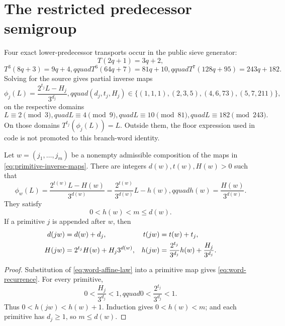 \section{The restricted predecessor semigroup}

Four exact lower-predecessor transports occur in the public sieve generator:
\[
 T(2q+1)=3q+2,
\]
\[
 T^3(8q+3)=9q+4,qquad
 T^6(64q+7)=81q+10,qquad
 T^7(128q+95)=243q+182.
\]
Solving for the source gives partial inverse maps
\begin{equation}
 \phi_j(L)=\frac{2^{t_j}L-H_j}{3^{d_j}},qquad
 (d_j,t_j,H_j)\in
 \{(1,1,1),(2,3,5),(4,6,73),(5,7,211)\},
 \label{eq:primitive-inverse-maps}
\end{equation}
on the respective domains
\[
 L\equiv2\pmod3,quad L\equiv4\pmod9,quad
 L\equiv10\pmod{81},quad L\equiv182\pmod{243}.
\]
On those domains $T^{t_j}(\phi_j(L))=L$.  Outside them, the floor expression
used in code is not promoted to this branch-word identity.

\begin{theorem}
\label{thm:predecessor-word-law}
Let $w=(j_1,\ldots,j_m)$ be a nonempty admissible composition of the maps in
\eqref{eq:primitive-inverse-maps}.  There are integers $d(w),t(w),H(w)>0$
such that
\begin{equation}
 \phi_w(L)=\frac{2^{t(w)}L-H(w)}{3^{d(w)}}
 =\frac{2^{t(w)}}{3^{d(w)}}L-h(w),qquad
 h(w)=\frac{H(w)}{3^{d(w)}}.
 \label{eq:word-affine-law}
\end{equation}
They satisfy
\begin{equation}
 0<h(w)<m\le d(w).
 \label{eq:word-rounding-loss}
\end{equation}
If a primitive $j$ is appended after $w$, then
\begin{align}
 d(jw)&=d(w)+d_j,&t(jw)&=t(w)+t_j,\notag\\
 H(jw)&=2^{t_j}H(w)+H_j3^{d(w)},&
 h(jw)&=\frac{2^{t_j}}{3^{d_j}}h(w)+\frac{H_j}{3^{d_j}}.
 \label{eq:word-recurrence}
\end{align}
\end{theorem}

\begin{proof}
Substitution of \eqref{eq:word-affine-law} into a primitive map gives
\eqref{eq:word-recurrence}.  For every primitive,
\[
 0<\frac{H_j}{3^{d_j}}<1,qquad
 0<\frac{2^{t_j}}{3^{d_j}}<1.
\]
Thus $0<h(jw)<h(w)+1$.  Induction gives $0<h(w)<m$; and each primitive has
$d_j\ge1$, so $m\le d(w)$.
\end{proof}

